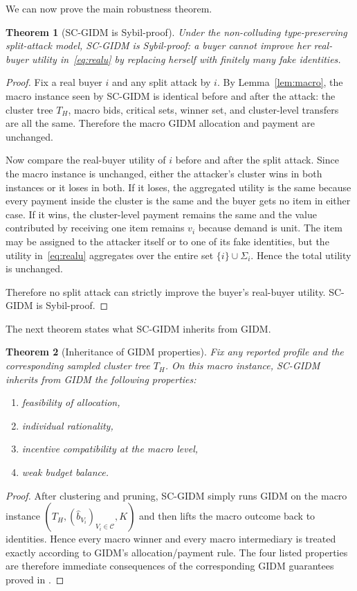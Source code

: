 \documentclass[sigconf]{aamas}
\newtheorem{theorem}{Theorem}
\theoremstyle{definition}
\theoremstyle{remark}
\newcommand{\Ccal}{\mathcal{C}}
\begin{document}
We can now prove the main robustness theorem.
\begin{theorem}[SC-GIDM is Sybil-proof]
\label{thm:sybil}
Under the non-colluding type-preserving split-attack model, SC-GIDM is Sybil-proof: a buyer cannot improve her real-buyer utility in~\eqref{eq:realu} by replacing herself with finitely many fake identities.
\end{theorem}
\begin{proof}
Fix a real buyer $i$ and any split attack by $i$. By Lemma~\ref{lem:macro}, the macro instance seen by SC-GIDM is identical before and after the attack: the cluster tree $T_H$, macro bids, critical sets, winner set, and cluster-level transfers are all the same. Therefore the macro GIDM allocation and payment are unchanged.

Now compare the real-buyer utility of $i$ before and after the split attack. Since the macro instance is unchanged, either the attacker's cluster wins in both instances or it loses in both. If it loses, the aggregated utility is the same because every payment inside the cluster is the same and the buyer gets no item in either case. If it wins, the cluster-level payment remains the same and the value contributed by receiving one item remains $v_i$ because demand is unit. The item may be assigned to the attacker itself or to one of its fake identities, but the utility in~\eqref{eq:realu} aggregates over the entire set $\{i\}\cup\Sigma_i$. Hence the total utility is unchanged.

Therefore no split attack can strictly improve the buyer's real-buyer utility. SC-GIDM is Sybil-proof.
\end{proof}

The next theorem states what SC-GIDM inherits from GIDM.
\begin{theorem}[Inheritance of GIDM properties]
\label{thm:inherit}
Fix any reported profile and the corresponding sampled cluster tree $T_H$. On this macro instance, SC-GIDM inherits from GIDM the following properties:
\begin{enumerate}[leftmargin=1.5em]
    \item feasibility of allocation,
    \item individual rationality,
    \item incentive compatibility at the macro level,
    \item weak budget balance.
\end{enumerate}
\end{theorem}
\begin{proof}
After clustering and pruning, SC-GIDM simply runs GIDM on the macro instance $(T_H,(\widehat b_{V_i})_{V_i\in\Ccal},K)$ and then lifts the macro outcome back to identities. Hence every macro winner and every macro intermediary is treated exactly according to GIDM's allocation/payment rule. The four listed properties are therefore immediate consequences of the corresponding GIDM guarantees proved in \cite{ZhaoLXHJ18}.
\end{proof}
\end{document}
